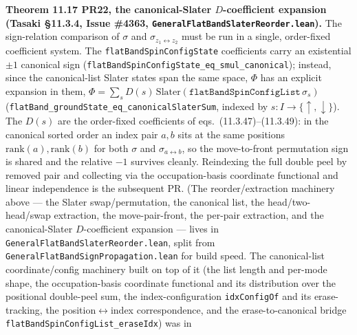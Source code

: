 \documentclass[a4paper,11pt]{article}
\begin{document}
\medskip\noindent\textbf{Theorem 11.17 PR22, the canonical-Slater $D$-coefficient expansion (Tasaki
§11.3.4, Issue \#4363, \texttt{GeneralFlatBandSlaterReorder.lean}).}  The sign-relation comparison
of $\sigma$ and $\sigma_{z_1\leftrightarrow z_2}$ must be run in a single, order-fixed coefficient
system.  The \texttt{flatBandSpinConfigState} coefficients carry an existential $\pm1$ canonical sign
(\texttt{flatBandSpinConfigState\_eq\_smul\_canonical}); instead, since the canonical-list Slater
states span the same space, $\Phi$ has an explicit expansion in them,
$\Phi=\sum_s D(s)\,\text{Slater}(\texttt{flatBandSpinConfigList}\,\sigma_s)$
(\texttt{flatBand\_groundState\_eq\_canonicalSlaterSum}, indexed by $s:I\to\{\uparrow,\downarrow\}$).
The $D(s)$ are the order-fixed coefficients of eqs.~(11.3.47)--(11.3.49): in the canonical sorted
order an index pair $a,b$ sits at the same positions $\mathrm{rank}(a),\mathrm{rank}(b)$ for both
$\sigma$ and $\sigma_{a\leftrightarrow b}$, so the move-to-front permutation sign is shared and the
relative $-1$ survives cleanly.  Reindexing the full double peel by removed pair and collecting via
the occupation-basis coordinate functional and linear independence is the subsequent PR.  (The
reorder/extraction machinery above --- the Slater swap/permutation, the canonical list, the
head/two-head/swap extraction, the move-pair-front, the per-pair extraction, and the
canonical-Slater $D$-coefficient expansion --- lives in \texttt{GeneralFlatBandSlaterReorder.lean},
split from \texttt{GeneralFlatBandSignPropagation.lean} for build speed.  The canonical-list
coordinate/config machinery built on top of it (the list length and per-mode shape, the
occupation-basis coordinate functional and its distribution over the positional double-peel sum,
the index-configuration \texttt{idxConfigOf} and its erase-tracking, the position$\leftrightarrow$index
correspondence, and the erase-to-canonical bridge \texttt{flatBandSpinConfigList\_eraseIdx}) was in
\end{document}

